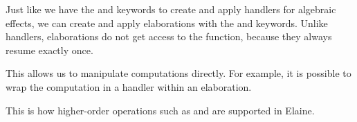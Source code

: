 Just like we have the  and  keywords to create and apply handlers for algebraic effects, we can create and apply elaborations with the  and  keywords. Unlike handlers, elaborations do not get access to the  function, because they always resume exactly once.

This allows us to manipulate computations directly. For example, it is possible to wrap the computation in a handler within an elaboration.


This is how higher-order operations such as  and  are supported in Elaine.

